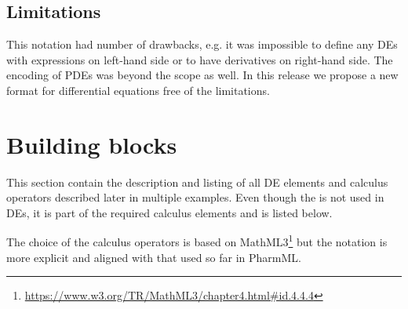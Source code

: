 \subsection{Limitations}
This notation had number of drawbacks, e.g. it was impossible to define any DEs
with expressions on left-hand side or to have derivatives on right-hand side. 
The encoding of PDEs was beyond the scope as well. In this release we propose 
a new format for differential equations free of the limitations.


\section{Building blocks}
\label{sec:CalcBuildingBlocks}
This section contain the description and listing of all DE elements and calculus 
operators described later in multiple examples. Even though the  
is not used in DEs, it is part of the required calculus elements and is listed below.

The choice of the calculus operators is based on MathML3\footnote{\url{https://www.w3.org/TR/MathML3/chapter4.html\#id.4.4.4}} but the notation is more explicit and aligned with that 
used so far in PharmML.

